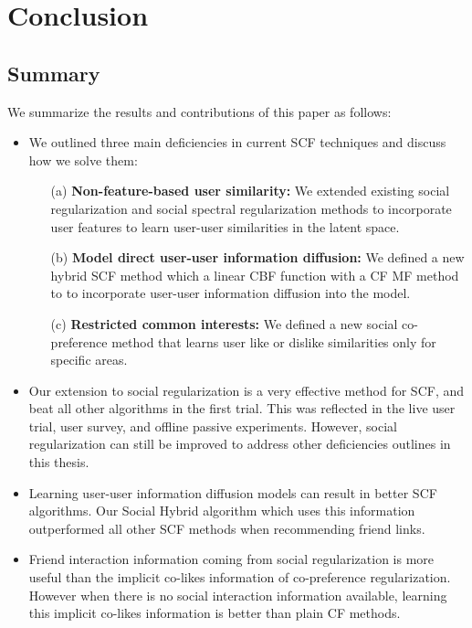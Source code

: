 
\chapter{Conclusion}

\section{Summary}

We summarize the results and contributions of this paper as follows:

\begin{itemize}
\item{
We outlined three main deficiencies in current SCF techniques and discuss how we solve them:

\begin{itemize}
\item[(a)] {\bf Non-feature-based user similarity:} 
We extended existing social regularization and social spectral regularization methods to incorporate user features to learn user-user similarities in the latent space.
\item[(b)] {\bf Model direct user-user information diffusion:} 
We defined a new hybrid SCF method which a linear CBF function with a CF MF method to to incorporate user-user information diffusion into the model. 
\item[(c)] {\bf Restricted common interests:}
We defined a new social co-preference method that learns user like or dislike similarities only for specific areas.
\end{itemize}
}

\item{Our extension to social regularization is a very effective method for SCF, and beat all other algorithms in the first trial. This was reflected in the live user trial, user survey, and offline passive experiments. However, social regularization can still be improved to address other deficiencies outlines in this thesis.}

\item{Learning user-user information diffusion models can result in better SCF algorithms. Our Social Hybrid algorithm which uses this information outperformed all other SCF methods when recommending friend links.}

\item {Friend interaction information coming from social regularization is more useful than the implicit co-likes information of co-preference regularization. However  when there is no social interaction information available, learning this implicit co-likes information is better than plain CF methods.}

\end{itemize}

